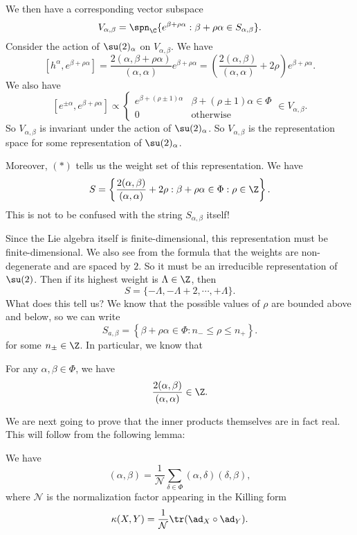 \documentclass[a4paper]{article}
\begin{document}
We then have a corresponding vector subspace
\[
  V_{\alpha, \beta} = \spn_\C\{e^{\beta + \rho \alpha}: \beta + \rho \alpha \in S_{\alpha,\beta}\}.
\]
Consider the action of $\su(2)_\alpha$ on $V_{\alpha, \beta}$. We have
\[
  [h^\alpha, e^{\beta + \rho \alpha}] = \frac{2(\alpha, \beta + \rho \alpha)}{(\alpha, \alpha)}e^{\beta + \rho \alpha} = \left(\frac{2 (\alpha, \beta)}{(\alpha, \alpha)} + 2\rho\right)e^{\beta + \rho \alpha}.\tag{$*$}
\]
We also have
\[
  [e^{\pm \alpha}, e^{\beta + \rho \alpha}] \propto
  \begin{cases}
    e^{\beta + (\rho \pm 1)\alpha} & \beta + (\rho \pm 1) \alpha \in \Phi\\
    0 & \text{otherwise}
  \end{cases} \in V_{\alpha, \beta}.
\]
So $V_{\alpha, \beta}$ is invariant under the action of $\su(2)_\alpha$. So $V_{\alpha, \beta}$ is the representation space for some representation of $\su(2)_\alpha$.

Moreover, $(*)$ tells us the weight set of this representation. We have
\[
  S = \left\{ \frac{2(\alpha , \beta)}{(\alpha, \alpha)} + 2\rho: \beta + \rho \alpha \in \Phi: \rho \in \Z\right\}.
\]
This is not to be confused with the string $S_{\alpha, \beta}$ itself!

Since the Lie algebra itself is finite-dimensional, this representation must be finite-dimensional. We also see from the formula that the weights are non-degenerate and are spaced by $2$. So it must be an irreducible representation of $\su(2)$. Then if its highest weight is $\Lambda \in \Z$, then
\[
  S = \{-\Lambda, -\Lambda + 2, \cdots, +\Lambda\}.
\]
What does this tell us? We know that the possible values of $\rho$ are bounded above and below, so we can write
\[
  S_{a, \beta} = \left\{ \beta + \rho \alpha \in \Phi: n_- \leq \rho \leq n_+\right\}.
\]
for some $n_{\pm} \in \Z$. In particular, we know that
\begin{prop}
  For any $\alpha, \beta \in \Phi$, we have
  \[
    \frac{2(\alpha, \beta)}{(\alpha,\alpha)} \in \Z.
  \]
\end{prop}

We are next going to prove that the inner products themselves are in fact real. This will follow from the following lemma:
\begin{lemma}
  We have
  \[
    (\alpha, \beta) = \frac{1}{\mathcal{N}} \sum_{\delta \in \Phi} (\alpha, \delta) (\delta, \beta),
  \]
  where $\mathcal{N}$ is the normalization factor appearing in the Killing form
  \[
    \kappa(X, Y) = \frac{1}{\mathcal{N}} \tr(\ad_X \circ \ad_Y).
  \]
\end{lemma}
\end{document}
